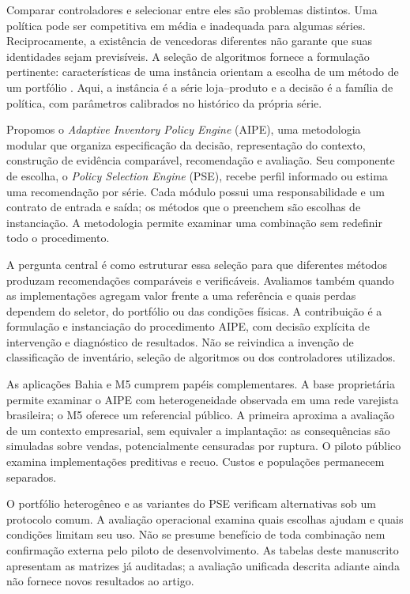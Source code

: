 \documentclass[preprint,12pt]{elsarticle}
\begin{document}
Comparar controladores e selecionar entre eles são problemas distintos. Uma política pode ser competitiva em média e inadequada para algumas séries. Reciprocamente, a existência de vencedoras diferentes não garante que suas identidades sejam previsíveis. A seleção de algoritmos fornece a formulação pertinente: características de uma instância orientam a escolha de um método de um portfólio \cite{rice1976,Kotthoff2014AlgorithmSelection}. Aqui, a instância é a série loja--produto e a decisão é a família de política, com parâmetros calibrados no histórico da própria série.

Propomos o \textit{Adaptive Inventory Policy Engine} (AIPE), uma metodologia modular que organiza especificação da decisão, representação do contexto, construção de evidência comparável, recomendação e avaliação. Seu componente de escolha, o \textit{Policy Selection Engine} (PSE), recebe perfil informado ou estima uma recomendação por série. Cada módulo possui uma responsabilidade e um contrato de entrada e saída; os métodos que o preenchem são escolhas de instanciação. A metodologia permite examinar uma combinação sem redefinir todo o procedimento.

A pergunta central é como estruturar essa seleção para que diferentes métodos produzam recomendações comparáveis e verificáveis. Avaliamos também quando as implementações agregam valor frente a uma referência e quais perdas dependem do seletor, do portfólio ou das condições físicas. A contribuição é a formulação e instanciação do procedimento AIPE, com decisão explícita de intervenção e diagnóstico de resultados. Não se reivindica a invenção de classificação de inventário, seleção de algoritmos ou dos controladores utilizados.

As aplicações Bahia e M5 cumprem papéis complementares. A base proprietária permite examinar o AIPE com heterogeneidade observada em uma rede varejista brasileira; o M5 oferece um referencial público. A primeira aproxima a avaliação de um contexto empresarial, sem equivaler a implantação: as consequências são simuladas sobre vendas, potencialmente censuradas por ruptura. O piloto público examina implementações preditivas e recuo. Custos e populações permanecem separados.

O portfólio heterogêneo e as variantes do PSE verificam alternativas sob um protocolo comum. A avaliação operacional examina quais escolhas ajudam e quais condições limitam seu uso. Não se presume benefício de toda combinação nem confirmação externa pelo piloto de desenvolvimento. As tabelas deste manuscrito apresentam as matrizes já auditadas; a avaliação unificada descrita adiante ainda não fornece novos resultados ao artigo.
\end{document}
